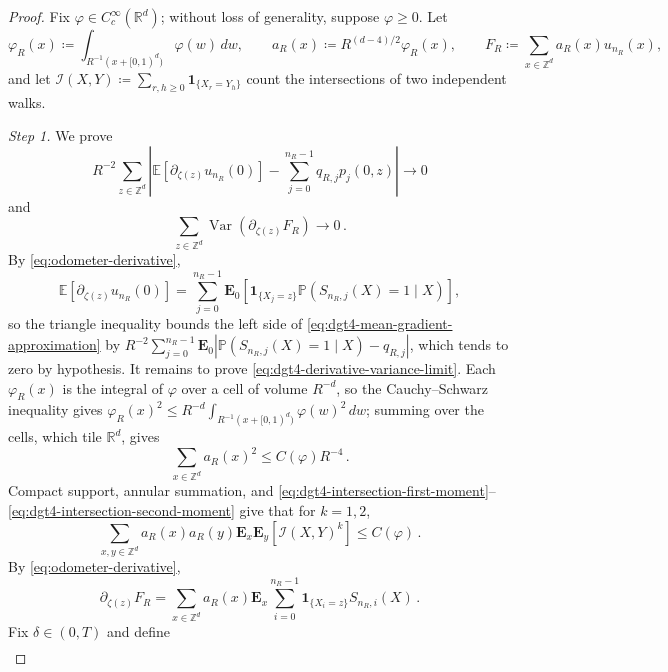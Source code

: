 \documentclass[11pt]{amsart}
\theoremstyle{plain}
\theoremstyle{definition}
\newcommand{\Z}{\mathbb{Z}}
\newcommand{\R}{\mathbb{R}}
\newcommand{\E}{\mathbb{E}}
\renewcommand{\P}{\mathbb{P}}
\DeclareMathOperator{\Var}{Var}
\newcommand{\one}{\mathbf{1}}
\begin{document}
\begin{proof}
	Fix $\varphi\in C_c^\infty(\R^d)$; without loss of generality, suppose $\varphi\geq0$. Let
	\[
		\varphi_R(x)\coloneqq\int_{R^{-1}(x+[0,1)^d)}\varphi(w)\,dw,
		\qquad a_R(x)\coloneqq R^{(d-4)/2}\varphi_R(x),
		\qquad F_R\coloneqq\sum_{x\in\Z^d}a_R(x)u_{n_R}(x),
	\]
	and let $\mathcal I(X,Y)\coloneqq\sum_{r,h\geq0}\one_{\{X_r=Y_h\}}$ count the intersections of
	two independent walks.

	\par\smallskip\noindent\emph{Step 1.} We prove
	\begin{equation}\label{eq:dgt4-mean-gradient-approximation}
		R^{-2}\sum_{z\in\Z^d}
		\left|
		\E[\partial_{\zeta(z)}u_{n_R}(0)]
		-\sum_{j=0}^{n_R-1}q_{R,j}p_j(0,z)
		\right|
		\longrightarrow0
	\end{equation}
	and
	\begin{equation}\label{eq:dgt4-derivative-variance-limit}
		\sum_{z\in\Z^d}\Var(\partial_{\zeta(z)}F_R)\longrightarrow0\, .
	\end{equation}
	By \eqref{eq:odometer-derivative},
	\[
		\E[\partial_{\zeta(z)}u_{n_R}(0)]
		=
		\sum_{j=0}^{n_R-1}\mathbf E_0\left[
		\one_{\{X_j=z\}}\P(S_{n_R,j}(X)=1\mid X)
		\right],
	\]
	so the triangle inequality bounds the left side of \eqref{eq:dgt4-mean-gradient-approximation}
	by $R^{-2}\sum_{j=0}^{n_R-1}\mathbf E_0|\P(S_{n_R,j}(X)=1\mid X)-q_{R,j}|$, which tends to zero
	by hypothesis.
	It remains to prove \eqref{eq:dgt4-derivative-variance-limit}. Each $\varphi_R(x)$ is the
	integral of $\varphi$ over a cell of volume $R^{-d}$, so the Cauchy--Schwarz inequality gives
	$\varphi_R(x)^2\leq R^{-d}\int_{R^{-1}(x+[0,1)^d)}\varphi(w)^2\,dw$; summing over the cells,
	which tile $\R^d$, gives
	\begin{equation}\label{eq:dgt4-tested-cell-l2}
		\sum_{x\in\Z^d}a_R(x)^2\leq C(\varphi)R^{-4}\, .
	\end{equation}
	Compact support, annular summation, and
	\eqref{eq:dgt4-intersection-first-moment}--
	\eqref{eq:dgt4-intersection-second-moment} give that for $k=1,2$,
	\begin{equation}\label{eq:dgt4-tested-intersection-moments}
		\sum_{x,y\in\Z^d}a_R(x)a_R(y)
		\mathbf E_x\mathbf E_y\left[\mathcal I(X,Y)^k\right]
		\leq C(\varphi)\, .
	\end{equation}
	By \eqref{eq:odometer-derivative},
	\[
		\partial_{\zeta(z)}F_R
		=
		\sum_{x\in\Z^d}a_R(x)\mathbf E_x
		\sum_{i=0}^{n_R-1}\one_{\{X_i=z\}}S_{n_R,i}(X)\, .
	\]
	Fix $\delta\in(0,T)$ and define
	\[
	\begin{aligned}

\end{aligned}\]
\end{proof}
\end{document}

